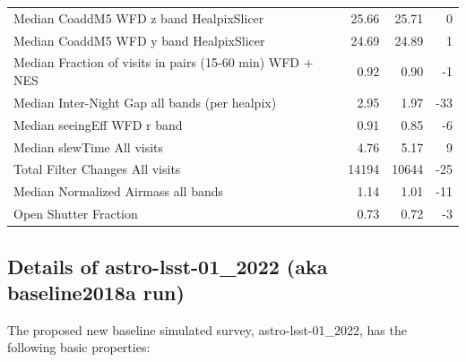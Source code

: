 \documentclass[DM,lsstdraft,authoryear,toc]{lsstdoc}
\begin{document}
\begin{table}
\begin{tabular}{lrrr}
Median CoaddM5 WFD z band HealpixSlicer            &               25.66 &               25.71 &          0 \\
Median CoaddM5 WFD y band HealpixSlicer            &               24.69 &               24.89 &          1 \\
Median Fraction of visits in pairs (15-60 min) WFD + NES &                0.92 &                0.90 &         -1 \\
Median Inter-Night Gap all bands (per healpix) &                2.95 &                1.97 &        -33 \\
Median seeingEff WFD r band                        &                0.91 &                0.85 &         -6 \\
Median slewTime All visits                         &                4.76 &                5.17 &          9 \\
Total Filter Changes All visits                    &               14194 &               10644 &        -25 \\
Median Normalized Airmass all bands                       &                1.14 &                1.01 &        -11 \\
Open Shutter Fraction                      &                0.73 &                0.72 &         -3 \\
\bottomrule
\end{tabular}
\label{tab:baseline_comparison}
\end{table}


\subsection{Details of astro-lsst-01\_2022 (aka baseline2018a run)}

The proposed new baseline simulated survey, astro-lsst-01\_2022, has the following basic properties:
\end{document}
